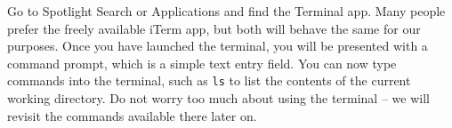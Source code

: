 Go to Spotlight Search or Applications and find the Terminal app.
Many people prefer the freely available iTerm app, but both will behave the same for our purposes.
Once you have launched the terminal, you will be presented with a command prompt, which is a simple text entry field.
You can now type commands into the terminal, such as \texttt{ls} to list the contents of the current working directory.
Do not worry too much about using the terminal -- we will revisit the commands available there later on.
